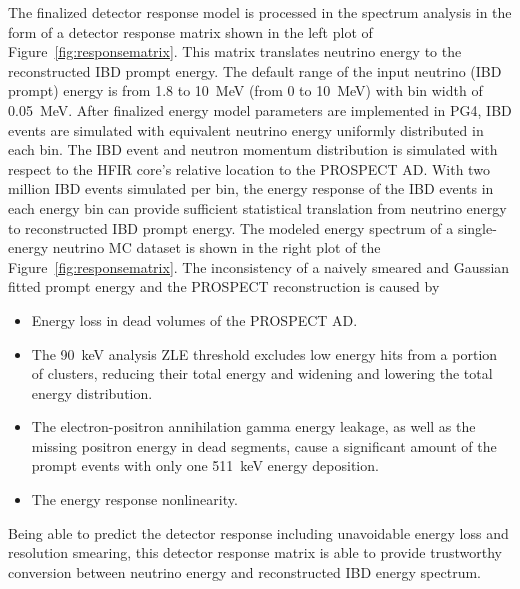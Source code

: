 The finalized detector response model is processed in the spectrum analysis in the form of a detector response matrix shown in the left plot of Figure~\ref{fig:responsematrix}.
This matrix translates neutrino energy to the reconstructed IBD prompt energy.
The default range of the input neutrino (IBD prompt) energy is from 1.8 to 10~MeV (from 0 to 10~MeV) with bin width of 0.05~MeV.
After finalized energy model parameters are implemented in PG4, IBD events are simulated with equivalent neutrino energy uniformly distributed in each bin. 
The IBD event and neutron momentum distribution is simulated with respect to the HFIR core's relative location to the PROSPECT AD.
With two million IBD events simulated per bin, the energy response of the IBD events in each energy bin can provide sufficient statistical translation from neutrino energy to reconstructed IBD prompt energy.
The modeled energy spectrum of a single-energy neutrino MC dataset is shown in the right plot of the Figure~\ref{fig:responsematrix}.
The inconsistency of a naively smeared and Gaussian fitted prompt energy and the PROSPECT reconstruction is caused by
\begin{itemize}
	\item Energy loss in dead volumes of the PROSPECT AD.
	\item The 90~keV analysis ZLE threshold excludes low energy hits from a portion of clusters, reducing their total energy and widening and lowering the total energy distribution.
	\item The electron-positron annihilation gamma energy leakage, as well as the missing positron energy in dead segments, cause a significant amount of the prompt events with only one 511~keV energy deposition.
	\item The energy response nonlinearity.
\end{itemize} 
Being able to predict the detector response including unavoidable energy loss and resolution smearing, this detector response matrix is able to provide trustworthy conversion between neutrino energy and reconstructed IBD energy spectrum.
